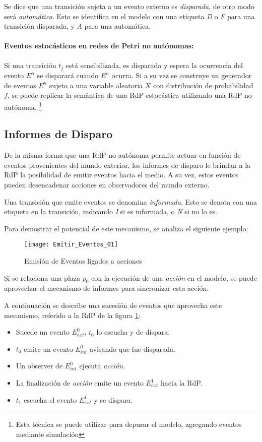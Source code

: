 Se dice que una transición sujeta a un evento externo es \textit{disparada}, de
otro modo será \textit{automática}. Esto se identifica en el modelo con una
etiqueta \textit{D} o \textit{F} para una transición disparada, y \textit{A}
para una automática.

\paragraph{Eventos estocásticos en redes de Petri no autónomas:}
Si una transición $t_{j}$ está sensibilizada, es disparada y espera la
ocurrencia del evento $E^{n}$ se disparará cuando $E^{n}$ ocurra.
Si a su vez se construye un generador de eventos $E^{n}$ sujeto a una variable
aleatoria $X$ con distribución de probabilidad $f$, se puede replicar la
semántica de una RdP estocástica utilizando una RdP no autónoma.
\footnote{Esta técnica se puede utilizar para depurar el modelo, agregando
eventos mediante simulación}

\subsection{Informes de Disparo}

De la misma forma que una RdP no autónoma permite actuar en función de eventos
provenientes del mundo exterior, los informes de disparo le brindan a la RdP la
posibilidad de emitir eventos hacia el medio. A su vez, estos eventos pueden
desencadenar acciones en observadores del mundo externo.

Una transición que emite eventos se denomina \textit{informada}.
Esto se denota con una etiqueta en la transición, indicando \textit{I} si es
informada, o \textit{N} si no lo es.

Para demostrar el potencial de este mecanismo, se analiza el siguiente ejemplo:

\begin{figure}[h]
  \centering
  \texttt{[image: Emitir\_Eventos\_01]}
  \caption{Emisión de Eventos ligados a acciones}
  \label{fig:eventos01}
\end{figure}

Si se relaciona una plaza $p_{0}$ con la ejecución de una
\textit{acción} en el modelo, se puede aprovechar el mecanismo
de informes para sincronizar esta acción.

A continuación se describe una sucesión de eventos que aprovecha este
mecanismo, referido a la RdP de la figura \ref{fig:eventos01}:
\begin{itemize}
  \item Sucede un evento $E_{ext}^{0}$, $t_{0}$ lo escucha y de dispara.
  \item $t_{0}$ emite un evento $E_{int}^{0}$ avisando que fue disparada.
  \item Un observer de $E_{int}^{0}$ ejecuta \textit{acción}.
  \item La finalización de \textit{acción} emite un evento
  $E_{ext}^{1}$ hacia la RdP.
  \item $t_{1}$ escucha el evento $E_{ext}^{1}$ y se dispara.
\end{itemize}

